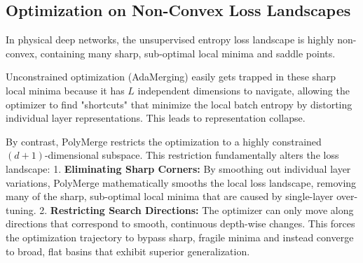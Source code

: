\subsection{Optimization on Non-Convex Loss Landscapes}
In physical deep networks, the unsupervised entropy loss landscape is highly non-convex, containing many sharp, sub-optimal local minima and saddle points. 

Unconstrained optimization (AdaMerging) easily gets trapped in these sharp local minima because it has $L$ independent dimensions to navigate, allowing the optimizer to find "shortcuts" that minimize the local batch entropy by distorting individual layer representations. This leads to representation collapse.

By contrast, PolyMerge restricts the optimization to a highly constrained $(d+1)$-dimensional subspace. This restriction fundamentally alters the loss landscape:
1. \textbf{Eliminating Sharp Corners:} By smoothing out individual layer variations, PolyMerge mathematically smooths the local loss landscape, removing many of the sharp, sub-optimal local minima that are caused by single-layer over-tuning.
2. \textbf{Restricting Search Directions:} The optimizer can only move along directions that correspond to smooth, continuous depth-wise changes. This forces the optimization trajectory to bypass sharp, fragile minima and instead converge to broad, flat basins that exhibit superior generalization.

